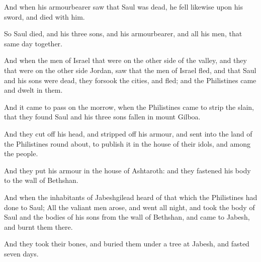 \verse And when his armourbearer saw that Saul was dead, he fell likewise upon his sword, and died with him.

\verse So Saul died, and his three sons, and his armourbearer, and all his men, that same day together.

\verse And when the men of Israel that were on the other side of the valley, and they that were on the other side Jordan, saw that the men of Israel fled, and that Saul and his sons were dead, they forsook the cities, and fled; and the Philistines came and dwelt in them.

\verse And it came to pass on the morrow, when the Philistines came to strip the slain, that they found Saul and his three sons fallen in mount Gilboa.

\verse And they cut off his head, and stripped off his armour, and sent into the land of the Philistines round about, to publish it in the house of their idols, and among the people.

\verse And they put his armour in the house of Ashtaroth: and they fastened his body to the wall of Bethshan.

\verse And when the inhabitants of Jabeshgilead heard of that which the Philistines had done to Saul; \verse All the valiant men arose, and went all night, and took the body of Saul and the bodies of his sons from the wall of Bethshan, and came to Jabesh, and burnt them there.

\verse And they took their bones, and buried them under a tree at Jabesh, and fasted seven days.


